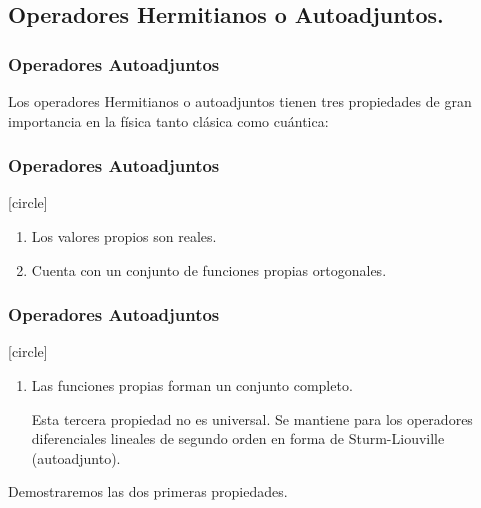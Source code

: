 \subsection{Operadores Hermitianos o Autoadjuntos.}
\begin{frame}
\frametitle{Operadores Autoadjuntos}
Los operadores Hermitianos o autoadjuntos tienen tres propiedades de gran importancia en la física tanto clásica como cuántica:
\end{frame}
\begin{frame}
\frametitle{Operadores Autoadjuntos}
[circle]
\begin{enumerate}[<+->]
\item Los valores propios son reales.
\item Cuenta con un conjunto de funciones propias ortogonales.
\seti
\end{enumerate}
\end{frame}
\begin{frame}
\frametitle{Operadores Autoadjuntos}
[circle]
\begin{enumerate}
\conti
\item Las funciones propias forman un conjunto completo.
\par
Esta tercera propiedad no es universal. Se mantiene para los operadores diferenciales lineales de segundo orden en forma de Sturm-Liouville (autoadjunto).
\end{enumerate}
Demostraremos las dos primeras propiedades.
\end{frame}
